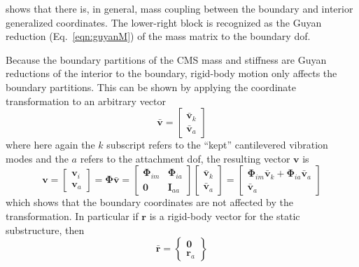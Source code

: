 \documentclass[11pt,openany,twoside]{book}
\numberwithin{equation}{section}		%
\newcommand{\Matrix}[1]{\boldsymbol{#1}}
\newcommand{\Vector}[1]{\boldsymbol{#1}}
\newcommand{\Eqn}[1]{Eq.\ \ref{#1}}  %
\begin{document}
shows that there is, in general, mass coupling between the
boundary and interior generalized coordinates.
The lower-right block is recognized as the Guyan reduction
(\Eqn{eqn:guyanM})
of the mass matrix to the boundary dof.

Because the boundary partitions of the CMS mass and stiffness
are Guyan reductions of the interior to the boundary, rigid-body
motion only affects the boundary partitions. This can be shown
by applying
the coordinate transformation to an arbitrary vector
\begin{equation}
\Vector{\bar{v}} = \left[
\begin{array}{c}
\Vector{\bar{v}}_k \\
\Vector{\bar{v}}_a
\end{array}
\right]				\nonumber
\end{equation}
where here again the $k$
subscript refers to the ``kept'' cantilevered vibration modes and the
$a$ refers to the attachment dof, the resulting vector $\Vector{v}$ is
\begin{equation}
\Vector{v} = \left[
\begin{array}{c}
\Vector{v}_i \\
\Vector{v}_a
\end{array}
\right] = \Matrix{\Phi} \Vector{\bar{v}} = \left[
\begin{array}{cc}
\Matrix{\Phi}_{im} & \Matrix{\Phi}_{ia} \\
\Matrix{0} & \Matrix{I}_{aa}
\end{array}
\right] \left[
\begin{array}{c}
\Matrix{\bar{v}}_k \\
\Matrix{\bar{v}}_a
\end{array}
\right] = \left[
\begin{array}{c}
\Matrix{\Phi}_{im} \Vector{\bar{v}}_k + \Matrix{\Phi}_{ia} \Vector{\bar{v}}_a \\
\Vector{\bar{v}}_{a}
\end{array}
\right]			\nonumber
\end{equation}
which shows that the boundary coordinates are not affected by the
transformation. In particular if $\Matrix{r}$ is a rigid-body vector
for the static substructure, then
\begin{equation}
\Vector{\bar{r}} = \left\{
        \begin{array}{c}
                \Vector{0}                \\
                \Vector{r}_{a}
        \end{array}
\right\}					\nonumber
\end{equation}
\end{document}
